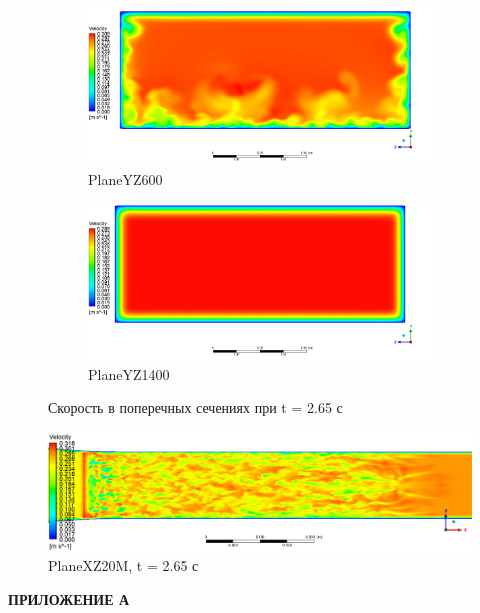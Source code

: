 \begin{figure}[H]
\begin{subfigure}{.5\textwidth}
		\centering
		\includegraphics[width=1.1\linewidth]{../Assets/T265_Velocity_ContourYZ600}
		\caption{PlaneYZ600}
		\label{fig:T265VelocityContourYZ600}
	\end{subfigure}%
	\begin{subfigure}{.5\textwidth}
		\centering
		\includegraphics[width=1.1\linewidth]{../Assets/T265_Velocity_ContourYZ1400}
		\caption{PlaneYZ1400}
		\label{fig:T265VelocityContourYZ1400}
	\end{subfigure}
	\caption{Скорость в поперечных сечениях при t = 2.65 с}
	\label{fig:T265VelocityContourYZ}
\end{figure}
\begin{figure}[H]
	\centering
	\includegraphics[width=1\linewidth]{../Assets/T265_Velocity_ContourXZ20M}
	\caption{PlaneXZ20M, t = 2.65 с}
	\label{fig:t265velocitycontourxz20m}
\end{figure}
\newpage
\begin{flushright}
	\MakeUppercase{\textbf{Приложение А}}
\end{flushright}
